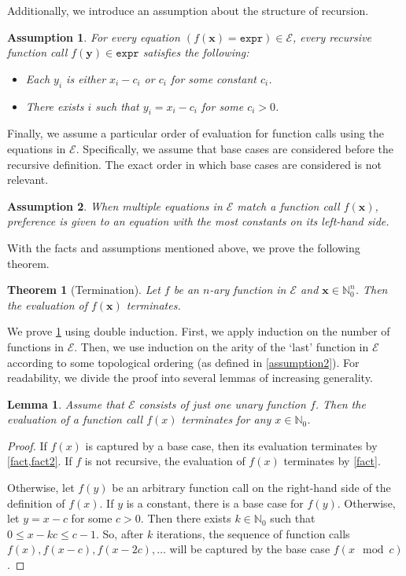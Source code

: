 \documentclass[letterpaper]{article} %
\newtheorem{theorem}{Theorem}
\newtheorem{assumption}{Assumption}
\newtheorem{lemma}{Lemma}
\theoremstyle{remark}
\theoremstyle{definition}
\newcommand{\expr}{\mathtt{expr}}
\begin{document}
Additionally, we introduce an assumption about the structure of recursion.

\begin{assumption}\label{assumption4}
  For every equation $(f(\mathbf{x}) = \expr) \in \mathcal{E}$, every recursive
  function call $f(\mathbf{y}) \in \expr$ satisfies the
  following:
  \begin{itemize}
    \item Each $y_{i}$ is either $x_{i} - c_{i}$ or $c_{i}$ for some constant
          $c_{i}$.
    \item There exists $i$ such that $y_{i} = x_{i} - c_{i}$ for some
          $c_{i} > 0$.
  \end{itemize}
\end{assumption}

Finally, we assume a particular order of evaluation for function calls using the
equations in $\mathcal{E}$. Specifically, we assume that base cases are
considered before the recursive definition. The exact order in which base cases
are considered is not relevant.

\begin{assumption}
  When multiple equations in $\mathcal{E}$ match a function call
  $f(\mathbf{x})$, preference is given to an equation with the most constants on
  its left-hand side.
\end{assumption}

With the facts and assumptions mentioned above, we prove the following theorem.

\begin{theorem}[Termination]\label{thm:halting}
  Let $f$ be an $n$-ary function in $\mathcal{E}$ and
  $\mathbf{x} \in \mathbb{N}_{0}^{n}$. Then the evaluation of $f(\mathbf{x})$
  terminates.
\end{theorem}

We prove \cref{thm:halting} using double induction. First, we apply induction on
the number of functions in $\mathcal{E}$. Then, we use induction on the arity of
the `last' function in $\mathcal{E}$ according to some topological ordering (as
defined in \cref{assumption2}). For readability, we divide the proof into
several lemmas of increasing generality.

\begin{lemma}\label{lemma:oneunary}
  Assume that $\mathcal{E}$ consists of just \emph{one unary} function $f$. Then
  the evaluation of a function call $f(x)$ terminates for any
  $x \in \mathbb{N}_{0}$.
\end{lemma}
\begin{proof}
  If $f(x)$ is captured by a base case, then its evaluation terminates by
  \cref{fact,fact2}. If $f$ is not recursive, the evaluation of
  $f(x)$ terminates by \cref{fact}.

  Otherwise, let $f(y)$ be an arbitrary function call on the right-hand side of
  the definition of $f(x)$. If $y$ is a constant, there is a base case for
  $f(y)$. Otherwise, let $y = x - c$ for some $c > 0$. Then there exists
  $k \in \mathbb{N}_{0}$ such that $0 \le x - kc \le c-1$. So, after $k$
  iterations, the sequence of function calls $f(x), f(x-c), f(x-2c),\dots$ will
  be captured by the base case $f(x \mod c)$.
\end{proof}
\end{document}
